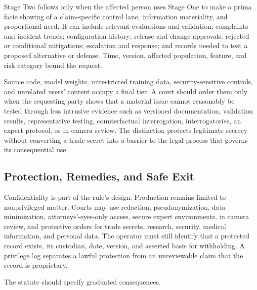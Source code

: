 Stage Two follows only when the affected person uses Stage One to make a prima facie showing of a claim-specific control lane, information materiality, and proportional need. It can include relevant evaluations and validation; complaints and incident trends; configuration history; release and change approvals; rejected or conditional mitigations; escalation and response; and records needed to test a proposed alternative or defense. Time, version, affected population, feature, and risk category bound the request.

Source code, model weights, unrestricted training data, security-sensitive controls, and unrelated users' content occupy a final tier. A court should order them only when the requesting party shows that a material issue cannot reasonably be tested through less intrusive evidence such as versioned documentation, validation results, representative testing, counterfactual interrogation, interrogatories, an expert protocol, or in camera review. The distinction protects legitimate secrecy without converting a trade secret into a barrier to the legal process that governs its consequential use.

\subsection{Protection, Remedies, and Safe Exit}
\label{sec:remedies}

Confidentiality is part of the rule's design. Production remains limited to nonprivileged matter. Courts may use redaction, pseudonymization, data minimization, attorneys'-eyes-only access, secure expert environments, in camera review, and protective orders for trade secrets, research, security, medical information, and personal data. The operator must still identify that a protected record exists, its custodian, date, version, and asserted basis for withholding. A privilege log separates a lawful protection from an unreviewable claim that the record is proprietary.

The statute should specify graduated consequences.

